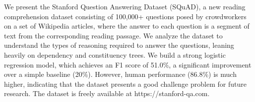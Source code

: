 We present the Stanford Question Answering Dataset (SQuAD), a new reading comprehension dataset consisting of 100,000+ questions posed by crowdworkers on a set of Wikipedia articles, where the answer to each question is a segment of text from the corresponding reading passage. We analyze the dataset to understand the types of reasoning required to answer the questions, leaning heavily on dependency and constituency trees. We build a strong logistic regression model, which achieves an F1 score of 51.0\%, a significant improvement over a simple baseline (20\%). However, human performance (86.8\%) is much higher, indicating that the dataset presents a good challenge problem for future research. The dataset is freely available at https://stanford-qa.com.
